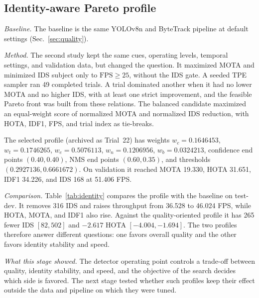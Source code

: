 \documentclass[journal]{new-aiaa}
\begin{document}
\subsection{Identity-aware Pareto profile}\label{sec:identity}

\emph{Baseline.} The baseline is the same YOLOv8n and ByteTrack pipeline at
default settings (Sec.~\ref{sec:quality}).

\emph{Method.} The second study kept
the same cues, operating levels, temporal settings, and validation data, but
changed the question. It maximized MOTA and minimized IDS subject only to
$\mathrm{FPS}\geq25$, without the IDS gate. A seeded TPE sampler ran 49
completed trials. A trial dominated another when it had no lower MOTA and no
higher IDS, with at least one strict improvement, and the feasible Pareto
front was built from these relations. The balanced
candidate maximized an equal-weight score of normalized MOTA and normalized IDS
reduction, with HOTA, IDF1, FPS, and trial index as tie-breaks.

The selected profile (archived as Trial~22) has weights $w_c=0.1646453$,
$w_t=0.1746265$, $w_e=0.5076113$, $w_n=0.1206956$, $w_b=0.0324213$,
confidence end points $(0.40,0.40)$, NMS end points $(0.60,0.35)$, and
thresholds $(0.2927136, 0.6661672)$. On validation it reached MOTA 19.330,
HOTA 31.651, IDF1 34.226, and IDS 168 at 51.406 FPS.

\emph{Comparison.} Table~\ref{tab:identity} compares the profile with the
baseline on test-dev. It removes 316 IDS and raises throughput
from 36.528 to 46.024 FPS, while HOTA, MOTA, and IDF1 also rise. Against the
quality-oriented profile it has 265 fewer IDS $[82, 502]$ and $-2.617$ HOTA
$[-4.004, -1.694]$. The two profiles therefore answer different questions: one
favors overall quality and the other favors identity stability and speed.

\emph{What this stage showed.} The detector operating point controls a
trade-off between quality, identity stability, and speed, and the objective
of the search decides which side is favored. The next stage tested whether
such profiles keep their effect outside the data and pipeline on which they
were tuned.
\end{document}
